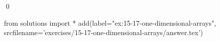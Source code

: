 
\begin{ex}
  \label{ex:15-17-one-dimensional-arrays}
  
  \qed
\end{ex}
\begin{python0}
from solutions import *
add(label="ex:15-17-one-dimensional-arrays",
    srcfilename='exercises/15-17-one-dimensional-arrays/answer.tex')
\end{python0}
